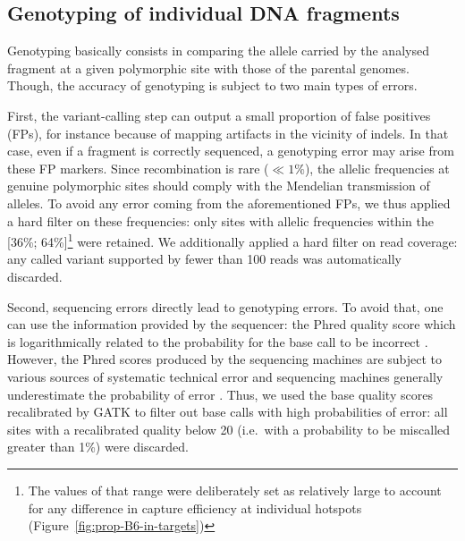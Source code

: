\subsection{Genotyping of individual DNA fragments}

Genotyping basically consists in comparing the allele carried by the analysed fragment at a given polymorphic site with those of the parental genomes.
Though, the accuracy of genotyping is subject to two main types of errors.

First, the variant-calling step can output a small proportion of false positives (FPs), for instance because of mapping artifacts in the vicinity of indels.
In that case, even if a fragment is correctly sequenced, a genotyping error may arise from these FP markers.
Since recombination is rare ($\ll 1\%$), the allelic frequencies at genuine polymorphic sites should comply with the Mendelian transmission of alleles.
To avoid any error coming from the aforementioned FPs, we thus applied a hard filter on these frequencies: only sites with allelic frequencies within the [36\%; 64\%]\footnote{The values of that range were deliberately set as relatively large to account for any difference in capture efficiency at individual hotspots (Figure~\ref{fig:prop-B6-in-targets})} were retained.
We additionally applied a hard filter on read coverage: any called variant supported by fewer than 100 reads was automatically discarded.

Second, sequencing errors directly lead to genotyping errors.
To avoid that, one can use the information provided by the sequencer: the Phred quality score which is logarithmically related to the probability for the base call to be incorrect \citep{ewing1998basecalling,ewing1998basecallinga}.
However, the Phred scores produced by the sequencing machines are subject to various sources of systematic technical error and sequencing machines generally underestimate the probability of error \citep{gatk2012base}.
Thus, we used the base quality scores recalibrated by GATK to filter out base calls with high probabilities of error: all sites with a recalibrated quality below 20 (i.e.\ with a probability to be miscalled greater than 1\%) were discarded.

